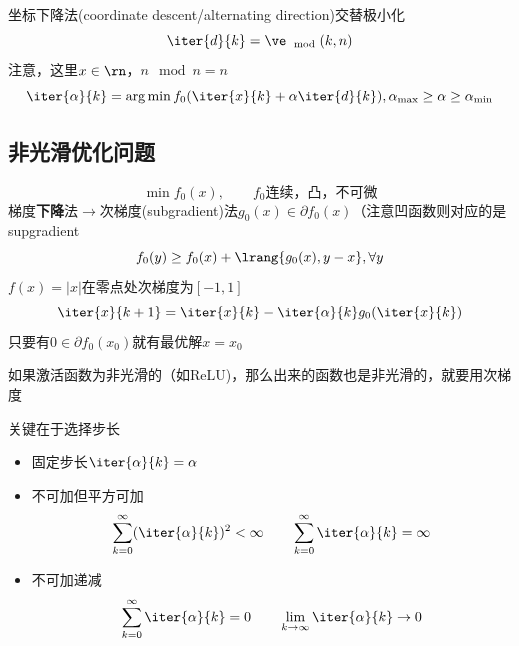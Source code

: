 坐标下降法(coordinate descent/alternating direction)交替极小化
\[\iter{d}{k}=\ve_{\mod{}{}}(k,n)\]
注意，这里$x\in\rn$，$n \mod n = n$
\[\iter{\alpha}{k}=\arg\min f_0(\iter{x}{k}+\alpha\iter{d}{k}),\alpha_{\max}\geq \alpha\geq \alpha_{\min}\]

\subsection{非光滑优化问题}
\[\min f_0(x),\qquad f_0\text{连续，凸，不可微}\]
梯度\textbf{下降}法$\to$次梯度(subgradient)法$g_0(x)\in\partial f_0(x)$（注意凹函数则对应的是supgradient
\[f_0(y)\geq f_0(x)+\lrang{g_0(x),y-x},\forall y\]
$f(x)=|x|$在零点处次梯度为$[-1,1]$
\[\iter{x}{k+1}=\iter{x}{k}-\iter{\alpha}{k}g_0(\iter{x}{k})\]
只要有$0\in\partial f_0(x_0)$就有最优解$x=x_0$

如果激活函数为非光滑的（如ReLU)，那么出来的函数也是非光滑的，就要用次梯度

关键在于选择步长
\begin{itemize}
    \item 固定步长$\iter{\alpha}{k}=\alpha$
    \item 不可加但平方可加
    \[\sum_{k=0}^\infty(\iter{\alpha}{k})^2<\infty\qquad \sum_{k=0}^\infty \iter{\alpha}{k}=\infty\]
    \item 不可加递减
    \[\sum_{k=0}^\infty\iter{\alpha}{k}=0\qquad\lim_{k\to\infty}\iter{\alpha}{k}\to 0\]
\end{itemize}